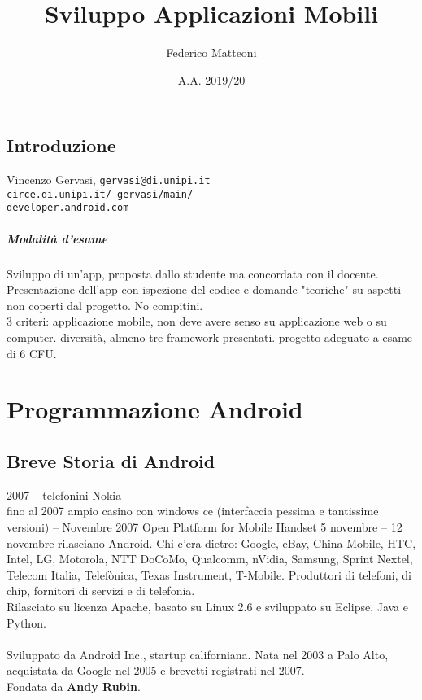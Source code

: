 \documentclass[10pt]{book}
\begin{document}
\renewcommand*\contentsname{Indice}
\title{Sviluppo Applicazioni Mobili}
\author{Federico Matteoni}
\date{A.A. 2019/20}
\maketitle
\tableofcontents
\pagebreak
\section*{Introduzione}
Vincenzo Gervasi, \texttt{gervasi@di.unipi.it}\\
\texttt{circe.di.unipi.it/~gervasi/main/}\\
\texttt{developer.android.com}

\paragraph{Modalità d'esame} Sviluppo di un'app, proposta dallo studente ma concordata con il docente. Presentazione dell'app con ispezione del codice e domande "teoriche" su aspetti non coperti dal progetto. No compitini.\\
3 criteri: applicazione mobile, non deve avere senso su applicazione web o su computer. diversità, almeno tre framework presentati. progetto adeguato a esame di 6 CFU.

\chapter{Programmazione Android}
\section{Breve Storia di Android}
2007 -- telefonini Nokia\\
fino al 2007 ampio casino con windows ce (interfaccia pessima e tantissime versioni) -- Novembre 2007 Open Platform for Mobile Handset 5 novembre -- 12 novembre rilasciano Android. Chi c'era dietro: Google, eBay, China Mobile, HTC, Intel, LG, Motorola, NTT DoCoMo, Qualcomm, nVidia, Samsung, Sprint Nextel, Telecom Italia, Telefònica, Texas Instrument, T-Mobile. Produttori di telefoni, di chip, fornitori di servizi e di telefonia.\\
Rilasciato su licenza Apache, basato su Linux 2.6 e sviluppato su Eclipse, Java e Python.\\\\
Sviluppato da Android Inc., startup californiana. Nata nel 2003 a Palo Alto, acquistata da Google nel 2005 e brevetti registrati nel 2007.\\
Fondata da \textbf{Andy Rubin}.
\end{document}
